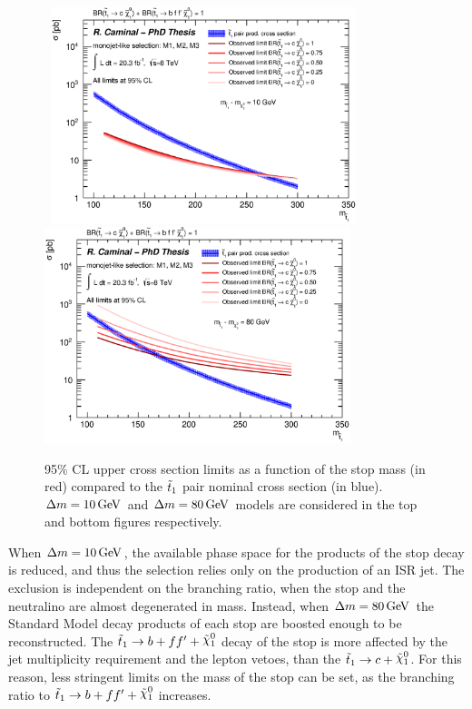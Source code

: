 \begin{figure}[!t]
\begin{center}
\mbox{
\includegraphics[width=0.795\textwidth]{Interpretations/Figures/upperLimitXSectionBR_Stop_dM_10_M1_M2_M3.eps}
}
\mbox{
\includegraphics[width=0.795\textwidth]{Interpretations/Figures/upperLimitXSectionBR_Stop_dM_80_M1_M2_M3.eps}
}
\end{center}
\caption[Upper limits on the stop pair production cross section at 95\% CL as a function of $m_{\stopone}$ for different branching ratios.]{95\% CL upper cross section limits as a function of the stop mass (in red) compared to the $\tilde{t}_1$ pair nominal cross section (in blue). $\Delta m = \unit[10]{GeV}$ and $\Delta m = \unit[80]{GeV}$ models are considered in the top and bottom figures respectively.}
\label{fig:ExclusionMixed}
\end{figure}

When $\Delta m = \unit[10]{GeV}$, the available phase space for the products of the stop decay is reduced, and thus the selection relies only on the production of an ISR jet.
The exclusion is independent on the branching ratio, when the stop and the neutralino are almost degenerated in mass.
Instead, when $\Delta m = \unit[80]{GeV}$ the Standard Model decay products of each stop are boosted enough to be reconstructed.
The $\stopfourbody$ decay of the stop is more affected by the jet multiplicity requirement and the lepton vetoes, than the $\stoptocharm$.
For this reason, less stringent limits on the mass of the stop can be set, as the branching ratio to $\stopfourbody$ increases.



